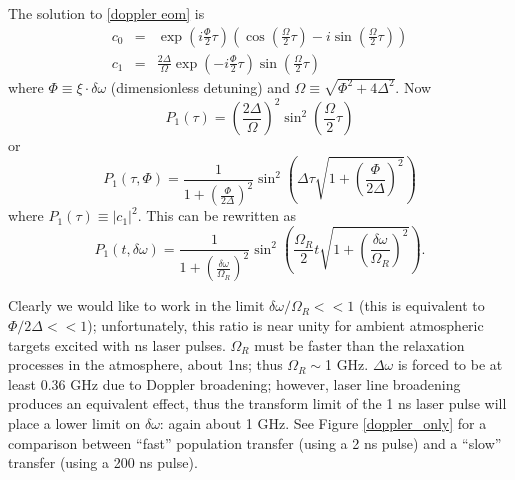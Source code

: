 The solution to \ref{doppler eom} is
\begin{subequations}
\begin{eqnarray}
c_0
&=&
\exp{\left(
i \frac{\Phi}{2} \tau
\right)}
\left(
\cos{\left(
\frac{\Omega}{2} \tau
\right)}
-
i\sin{\left(
\frac{\Omega}{2} \tau
\right)}
\right)
\\
c_1
&=&
\frac{2 \Delta}{\Omega}
\exp{\left(
-i \frac{\Phi}{2} \tau
\right)}
\sin{\left(
\frac{\Omega}{2} \tau
\right)}
\end{eqnarray}
\end{subequations}
where $\Phi \equiv \xi \cdot\delta\omega$ (dimensionless detuning) and $\Omega\equiv \sqrt{\Phi^2 +4\Delta^2}$. Now
\begin{equation}
P_1(\tau)
=
\left( \frac{2 \Delta}{\Omega} \right)^2
\sin^2{\left(
\frac{\Omega}{2} \tau
\right)}
\end{equation}
or
\begin{equation}
P_1(\tau,\Phi)
=
\frac
{1}
{
1+\left(\frac{\Phi}{2\Delta}\right)^2
}
\sin^2{\left(
\Delta \tau \sqrt{1+\left(\frac{\Phi}{2\Delta}\right)^2}
\right)}
\end{equation}
where $P_1(\tau)\equiv|c_1|^2$. This can be rewritten as
\begin{equation}
\boxed{
P_1(t,\delta\omega)
=
\frac
{1}
{
1+\left(\frac{\delta\omega}{\Omega_R}\right)^2
}
\sin^2{\left( 
\frac{\Omega_R}{2} t \sqrt{1+\left(\frac{\delta\omega}{\Omega_R}\right)^2}
\right)}.
\label{final eom}
}
\end{equation}


Clearly we would like to work in the limit $\delta\omega/\Omega_R<<1$ (this is equivalent to $\Phi/2\Delta<<1$); unfortunately, this ratio is near unity for ambient atmospheric targets excited with ns laser pulses. $\Omega_R$ must be faster than the relaxation processes in the atmosphere, about 1ns; thus $\Omega_R\sim$1 GHz. $\Delta\omega$ is forced to be at least 0.36 GHz due to Doppler broadening; however, laser line broadening produces an equivalent effect, thus the transform limit of the 1  ns laser pulse will place a lower limit on $\delta\omega$: again about 1 GHz. See Figure \ref{doppler_only} for a comparison between ``fast'' population transfer (using a 2 ns pulse) and a ``slow'' transfer (using a 200 ns pulse).
